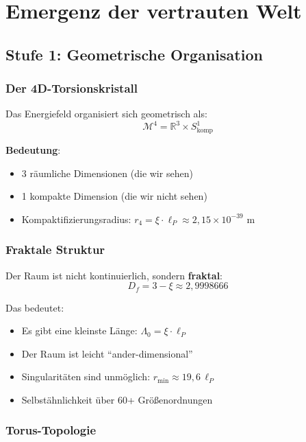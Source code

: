 	\section{Emergenz der vertrauten Welt}

	\subsection{Stufe 1: Geometrische Organisation}

	\subsubsection{Der 4D-Torsionskristall}

	Das Energiefeld organisiert sich geometrisch als:
	\begin{equation}
		\mathcal{M}^4 = \mathbb{R}^3 \times S^1_{\text{komp}}
	\end{equation}

	\textbf{Bedeutung}:
	\begin{itemize}
		\item 3 räumliche Dimensionen (die wir sehen)
		\item 1 kompakte Dimension (die wir nicht sehen)
		\item Kompaktifizierungsradius: $r_4 = \xi \cdot \ell_P \approx 2{,}15 \times 10^{-39}$ m
	\end{itemize}

	\subsubsection{Fraktale Struktur}

	Der Raum ist nicht kontinuierlich, sondern \textbf{fraktal}:
	\begin{equation}
		D_f = 3 - \xi \approx 2{,}9998666
	\end{equation}

	Das bedeutet:
	\begin{itemize}
		\item Es gibt eine kleinste Länge: $\Lambda_0 = \xi \cdot \ell_P$
		\item Der Raum ist leicht \enquote{ander-dimensional}
		\item Singularitäten sind unmöglich: $r_{\min} \approx 19{,}6\,\ell_P$
		\item Selbstähnlichkeit über 60+ Größenordnungen
	\end{itemize}

	\subsubsection{Torus-Topologie}


